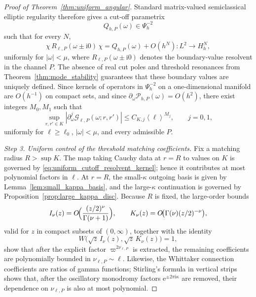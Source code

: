 \documentclass[10pt,a4paper]{amsart}
\newcommand{\abs}[1]{\left|#1\right|}
\newcommand{\angles}[1]{\left\langle #1 \right\rangle}
\newcommand{\cG}{\mathcal G}
\newcommand{\ee}{\mathrm e}
\newcommand{\ii}{\mathrm i}
\newcommand{\kap}{\kappa}
\newcommand{\om}{\omega}
\newcommand{\vp}{\varpi}
\begin{document}
\begin{proof}[Proof of Theorem~\ref{thm:uniform_angular}]
Standard matrix-valued semiclassical elliptic regularity therefore gives a cut-off parametrix
\[
   Q_{h,P}(\om)\in\Psi_h^{-2}
\]
such that for every $N$,
\begin{equation}\label{eq:uniform_angular_parametrix}
   \chi\,R_{\ell,P}(\om\pm\ii0)\,\chi
   =
   Q_{h,P}(\om)
   +O(h^N):L^2\to H_h^N,
\end{equation}
uniformly for $\abs{\om}<\mu$, where $R_{\ell,P}(\om\pm\ii0)$ denotes the boundary-value resolvent in the channel $P$.  The absence of real cut poles and threshold resonances from Theorem~\ref{thm:mode_stability} guarantees that these boundary values are uniquely defined.  Since kernels of operators in $\Psi_h^{-2}$ on a one-dimensional manifold are $O(h^{-1})$ on compact sets, and since $\partial_\om\mathcal P_{h,P}(\om)=O(h^2)$, there exist integers $M_0,M_1$ such that
\begin{equation}\label{eq:uniform_cutoff_resolvent_kernel}
   \sup_{r,r'\in K}
   \abs{\partial_\om^j\cG_{\ell,P}(\om;r,r')}
   \le
   C_{K,j}\angles{\ell}^{M_j},
   \qquad j=0,1,
\end{equation}
uniformly for $\ell\ge\ell_0$, $\abs{\om}<\mu$, and every admissible $P$.

\smallskip
\noindent\textit{Step 3. Uniform control of the threshold matching coefficients.}
Fix a matching radius $R>\sup K$.  The map taking Cauchy data at $r=R$ to values on $K$ is governed by \eqref{eq:uniform_cutoff_resolvent_kernel}; hence it contributes at most polynomial factors in $\ell$.  At $r=R$, the small-$\kap$ outgoing basis is given by Lemma~\ref{lem:small_kappa_basis}, and the large-$\kap$ continuation is governed by Proposition~\ref{prop:large_kappa_disc}.  Because $R$ is fixed, the large-order bounds
\[
   I_\nu(z)=O\!\Bigl(\frac{(z/2)^\nu}{\Gamma(\nu+1)}\Bigr),
   \qquad
   K_\nu(z)=O\!\bigl(\Gamma(\nu)(z/2)^{-\nu}\bigr),
\]
valid for $z$ in compact subsets of $(0,\infty)$, together with the identity
\[
   W\bigl(\sqrt z\,I_\nu(z),\sqrt z\,K_\nu(z)\bigr)=1,
\]
show that after the explicit factor $\vp^{2\nu_{\ell,P}}$ is extracted, the remaining coefficients are polynomially bounded in $\nu_{\ell,P}\sim \ell$.  Likewise, the Whittaker connection coefficients are ratios of gamma functions; Stirling's formula in vertical strips shows that, after the oscillatory monodromy factors $\ee^{\pm2\pi\ii\kap}$ are removed, their dependence on $\nu_{\ell,P}$ is also at most polynomial.


\end{proof}
\end{document}
